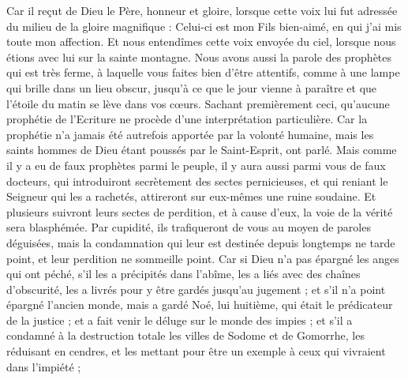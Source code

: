 \begin{multicols}{2}
Car il reçut de Dieu le Père, honneur et gloire, lorsque cette voix lui fut adressée du milieu de la gloire magnifique : Celui-ci est mon Fils bien-aimé, en qui j'ai mis toute mon affection{}.
Et nous entendîmes cette voix envoyée du ciel, lorsque nous étions avec lui sur la sainte montagne.
Nous avons aussi la parole des prophètes qui est très ferme, à laquelle vous faites bien d'être attentifs, comme à une lampe qui brille dans un lieu obscur, jusqu'à ce que le jour vienne à paraître et que l'étoile du matin{} se lève dans vos cœurs.
Sachant premièrement ceci, qu'aucune prophétie de l'Ecriture ne procède d’une interprétation particulière.
Car la prophétie n'a jamais été autrefois apportée par la volonté humaine, mais les saints hommes de Dieu étant poussés par le Saint-Esprit, ont parlé.
\VerseOne{}Mais comme il y a eu de faux prophètes parmi le peuple, il y aura aussi parmi vous de faux docteurs, qui introduiront secrètement des sectes pernicieuses, et qui reniant le Seigneur qui les a rachetés, attireront sur eux-mêmes une ruine soudaine.
Et plusieurs suivront leurs sectes de perdition, et à cause d'eux, la voie de la vérité sera blasphémée.
Par cupidité, ils trafiqueront{} de vous au moyen de paroles déguisées, mais la condamnation qui leur est destinée depuis longtemps ne tarde point, et leur perdition ne sommeille point.
Car si Dieu n'a pas épargné les anges qui ont péché, s’il les a précipités dans l'abîme{}, les a liés avec des chaînes d'obscurité, les a livrés pour y être gardés jusqu’au jugement ;
et s'il n'a point épargné l’ancien monde, mais a gardé Noé{}, lui huitième, qui était le prédicateur de la justice ; et a fait venir le déluge sur le monde des impies ;
et s'il a condamné à la destruction totale les villes de Sodome et de Gomorrhe, les réduisant en cendres, et les mettant pour être un exemple à ceux qui vivraient dans l'impiété ;

\end{multicols}
